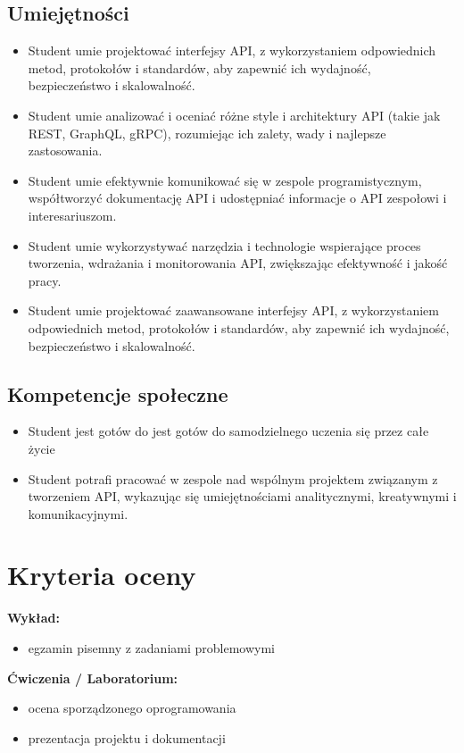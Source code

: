 \documentclass[12pt, a4paper]{article}
\begin{document}
\subsection*{Umiejętności}
\begin{itemize}
  \item Student umie projektować interfejsy API, z wykorzystaniem odpowiednich metod, protokołów i standardów, aby zapewnić ich wydajność, bezpieczeństwo i skalowalność.
  \item Student umie analizować i oceniać różne style i architektury API (takie jak REST, GraphQL, gRPC), rozumiejąc ich zalety, wady i najlepsze zastosowania.
  \item Student umie efektywnie komunikować się w zespole programistycznym, współtworzyć dokumentację API i udostępniać informacje o API zespołowi i interesariuszom.
  \item Student umie wykorzystywać narzędzia i technologie wspierające proces tworzenia, wdrażania i monitorowania API, zwiększając efektywność i jakość pracy.
  \item Student umie projektować zaawansowane interfejsy API, z wykorzystaniem odpowiednich metod, protokołów i standardów, aby zapewnić ich wydajność, bezpieczeństwo i skalowalność.
\end{itemize}

\subsection*{Kompetencje społeczne}
\begin{itemize}
  \item Student jest gotów do jest gotów do samodzielnego uczenia się przez całe życie
  \item Student potrafi pracować w zespole nad wspólnym projektem związanym z tworzeniem API, wykazując się umiejętnościami analitycznymi, kreatywnymi i komunikacyjnymi.
\end{itemize}

\section{Kryteria oceny}

\textbf{Wykład:}
\begin{itemize}
  \item egzamin pisemny z zadaniami problemowymi
\end{itemize}
\vspace{4pt}
\textbf{Ćwiczenia / Laboratorium:}
\begin{itemize}
  \item ocena sporządzonego oprogramowania
  \item prezentacja projektu i dokumentacji
\end{itemize}
\end{document}

